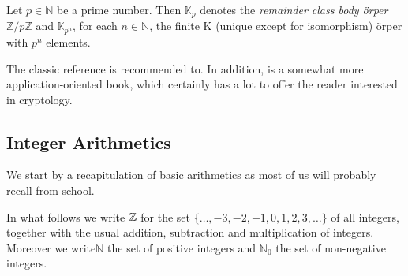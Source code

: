 \begin{definition} Let $ p \in \mathbb{N} $ be a prime number. Then $ \mathbb{K} _p $ denotes the \textit{remainder class body \"orper} $ \mathbb{ Z} / p \mathbb{Z} $ and $ \mathbb{K} _{p ^ n} $, for each $ n \in \mathbb{N} $, the finite K (unique except for isomorphism) \"orper with $ p ^ n $ elements.
\end{definition} 

The classic reference \cite{HW} is recommended to. In addition, \cite{FO} is a somewhat more application-oriented book, which certainly has a lot to offer the reader interested in cryptology.

\subsection{Integer Arithmetics}
\label{integer_arithmetics}
We start by a recapitulation of basic arithmetics as most of us will probably recall from school.

In what follows we write $\mathbb{Z}$ for the set $\{\ldots, -3,-2,-1,0,1,2,3,\ldots\}$ of all integers, together with the usual addition, subtraction and multiplication of integers. Moreover we write$\mathbb{N}$ the set of positive integers and $\mathbb{N}_0$ the set of non-negative integers.

